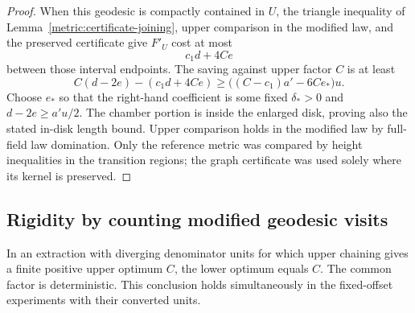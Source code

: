 \begin{proof}
When this geodesic is compactly contained in $U$, the triangle inequality
of Lemma~\ref{metric:certificate-joining}, upper comparison in the modified
law, and the preserved certificate give $F'_U$ cost at most
\[
 c_1d+4Ce
\]
between those interval endpoints. The saving against upper factor $C$
is at least
\[
 C(d-2e)-(c_1d+4Ce)
 \ge \bigl((C-c_1)a'-6Ce_*\bigr)u.
\]
Choose $e_*$ so that the right-hand coefficient is some fixed
$\delta_*>0$ and $d-2e\ge a'u/2$. The chamber portion is inside the
enlarged disk, proving also the stated in-disk length bound. Upper
comparison holds in the modified law by full-field law domination.
Only the reference metric was compared by height inequalities in the
transition regions; the graph certificate was used solely where its
kernel is preserved.
\end{proof}

\subsection{Rigidity by counting modified geodesic visits}

\begin{proposition}\label{metric:rigidity}
In an extraction with diverging denominator units for which upper chaining
gives a finite positive upper optimum $C$, the lower optimum equals $C$.
The common factor is deterministic. This conclusion holds simultaneously
in the fixed-offset experiments with their converted units.
\end{proposition}

